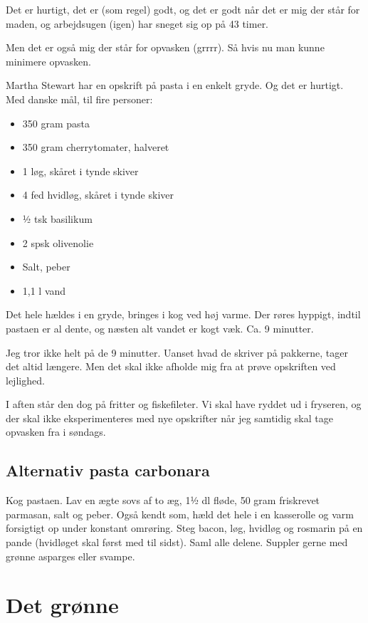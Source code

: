 \documentclass[
]{book}
\providecommand{\tightlist}{%
  \setlength{\itemsep}{0pt}\setlength{\parskip}{0pt}}
\begin{document}
Det er hurtigt, det er (som regel) godt, og det er godt når det er mig der står for maden, og arbejdsugen (igen) har sneget sig op på 43 timer.

Men det er også mig der står for opvasken (grrrr). Så hvis nu man kunne minimere opvasken.

Martha Stewart har en opskrift på pasta i en enkelt gryde. Og det er hurtigt. Med danske mål, til fire personer:

\begin{itemize}
\tightlist
\item
  350 gram pasta
\item
  350 gram cherrytomater, halveret
\item
  1 løg, skåret i tynde skiver
\item
  4 fed hvidløg, skåret i tynde skiver
\item
  ½ tsk basilikum
\item
  2 spsk olivenolie
\item
  Salt, peber
\item
  1,1 l vand
\end{itemize}

Det hele hældes i en gryde, bringes i kog ved høj varme. Der røres hyppigt, indtil pastaen er al dente, og næsten alt vandet er kogt væk. Ca. 9 minutter.

Jeg tror ikke helt på de 9 minutter. Uanset hvad de skriver på pakkerne, tager det altid længere. Men det skal ikke afholde mig fra at prøve opskriften ved lejlighed.

I aften står den dog på fritter og fiskefileter. Vi skal have ryddet ud i fryseren, og der skal ikke eksperimenteres med nye opskrifter når jeg samtidig skal tage opvasken fra i søndags.

\section{Alternativ pasta carbonara}\label{alternativ-pasta-carbonara}

Kog pastaen.
Lav en ægte sovs af to æg, 1½ dl fløde, 50 gram friskrevet parmasan, salt og peber. Også kendt som, hæld det hele i en kasserolle og varm forsigtigt op under konstant omrøring.
Steg bacon, løg, hvidløg og rosmarin på en pande (hvidløget skal først med til sidst).
Saml alle delene.
Suppler gerne med grønne asparges eller svampe.

\chapter{Det grønne}\label{det-gruxf8nne}
\end{document}
